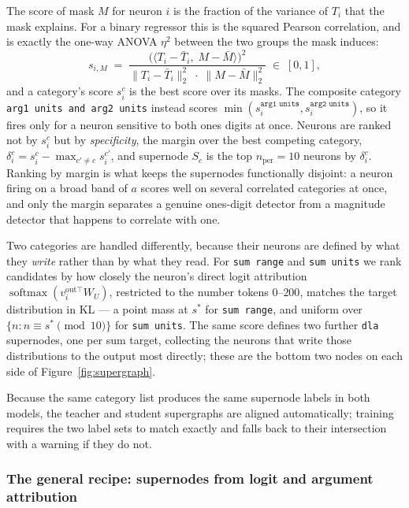 \documentclass{article}
\DeclareMathOperator{\softmax}{softmax}
\begin{document}
\noindent
The score of mask $M$ for neuron $i$ is the fraction of the variance of $T_i$ that the mask
explains. For a binary regressor this is the squared Pearson correlation, and is exactly the
one-way ANOVA $\eta^2$ between the two groups the mask induces:
\begin{equation}
  s_{i,M}
  \;=\;
  \frac{\bigl(\langle T_i - \bar{T}_i,\; M - \bar{M}\rangle\bigr)^2}
       {\|T_i - \bar{T}_i\|_2^2 \;\cdot\; \|M - \bar{M}\|_2^2}
  \;\in\; [0,1],
  \label{eq:anova}
\end{equation}
and a category's score $s_i^c$ is the best score over its masks. The composite category
\texttt{arg1 units and arg2 units} instead scores $\min(s_i^{\texttt{arg1 units}},
s_i^{\texttt{arg2 units}})$, so it fires only for a neuron sensitive to both ones digits at once.
Neurons are ranked not by $s_i^c$ but by \emph{specificity}, the margin over the best competing
category, $\delta_i^c = s_i^c - \max_{c' \neq c} s_i^{c'}$, and supernode $S_c$ is the top
$n_{\mathrm{per}} = 10$ neurons by $\delta_i^c$. Ranking by margin is what keeps the supernodes
functionally disjoint: a neuron firing on a broad band of $a$ scores well on several correlated
categories at once, and only the margin separates a genuine ones-digit detector from a magnitude
detector that happens to correlate with one.

Two categories are handled differently, because their neurons are defined by what they \emph{write}
rather than by what they read. For \texttt{sum range} and \texttt{sum units} we rank candidates by
how closely the neuron's direct logit attribution $\softmax(v^{\mathrm{out}\top}_i W_U)$, restricted
to the number tokens $0$--$200$, matches the target distribution in KL --- a point mass at $s^{*}$
for \texttt{sum range}, and uniform over $\{n : n \equiv s^{*} \!\!\pmod{10}\}$ for
\texttt{sum units}. The same score defines two further \texttt{dla} supernodes, one per sum target,
collecting the neurons that write those distributions to the output most directly; these are the
bottom two nodes on each side of Figure~\ref{fig:supergraph}.

Because the same category list produces the same supernode labels in both models, the teacher and
student supergraphs are aligned automatically; training requires the two label sets to match exactly
and falls back to their intersection with a warning if they do not.

\subsubsection{The general recipe: supernodes from logit and argument attribution}
\label{sec:supernodes-general}
\end{document}
